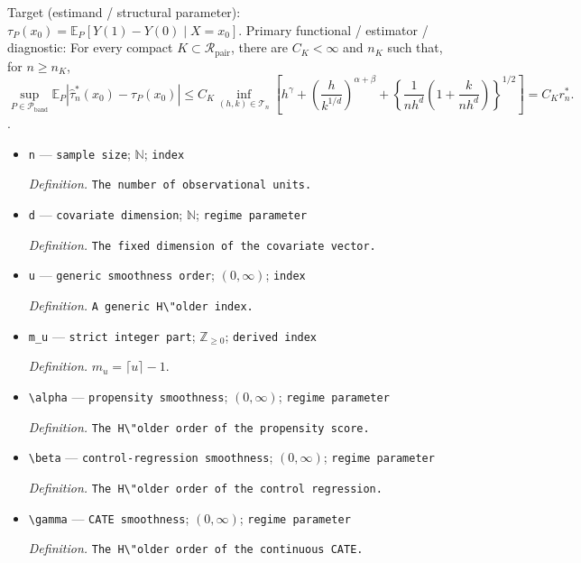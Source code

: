 \documentclass{article}
\begin{document}
Target (estimand / structural parameter): \(\tau_P(x_0)=\mathbb{E}_P[Y(1)-Y(0)\mid X=x_0]\).
Primary functional / estimator / diagnostic: For every compact \(K\subset\mathcal R_{\mathrm{pair}}\), there are \(C_K<\infty\) and \(n_K\) such that, for \(n\geq n_K\), \[\sup_{P\in\mathcal{P}_{\mathrm{band}}}\mathbb{E}_P|\widehat{\tau}^{*}_n(x_0)-\tau_P(x_0)|\leq C_K\inf_{(h,k)\in\mathcal T_n}\left[h^\gamma+\left(\frac{h}{k^{1/d}}\right)^{\alpha+\beta}+\left\{\frac{1}{nh^d}\left(1+\frac{k}{nh^d}\right)\right\}^{1/2}\right]=C_Kr_n^*.\].
\begin{itemize}
  \item \texttt{n} --- \texttt{sample size}; \(\mathbb{N}\); \texttt{index}
  \par\smallskip\noindent\emph{Definition.} \texttt{The number of observational units.}
  \item \texttt{d} --- \texttt{covariate dimension}; \(\mathbb{N}\); \texttt{regime parameter}
  \par\smallskip\noindent\emph{Definition.} \texttt{The fixed dimension of the covariate vector.}
  \item \texttt{u} --- \texttt{generic smoothness order}; \((0,\infty)\); \texttt{index}
  \par\smallskip\noindent\emph{Definition.} \texttt{A generic H\textbackslash{}\allowbreak{}"older index.}
  \item \texttt{m\_\allowbreak{}u} --- \texttt{strict integer part}; \(\mathbb{Z}_{\geq 0}\); \texttt{derived index}
  \par\smallskip\noindent\emph{Definition.} \(m_u=\lceil u\rceil-1\).
  \item \texttt{\textbackslash{}\allowbreak{}alpha} --- \texttt{propensity smoothness}; \((0,\infty)\); \texttt{regime parameter}
  \par\smallskip\noindent\emph{Definition.} \texttt{The H\textbackslash{}\allowbreak{}"older order of the propensity score.}
  \item \texttt{\textbackslash{}\allowbreak{}beta} --- \texttt{control-\allowbreak{}regression smoothness}; \((0,\infty)\); \texttt{regime parameter}
  \par\smallskip\noindent\emph{Definition.} \texttt{The H\textbackslash{}\allowbreak{}"older order of the control regression.}
  \item \texttt{\textbackslash{}\allowbreak{}gamma} --- \texttt{CATE smoothness}; \((0,\infty)\); \texttt{regime parameter}
  \par\smallskip\noindent\emph{Definition.} \texttt{The H\textbackslash{}\allowbreak{}"older order of the continuous CATE.}

\end{itemize}
\end{document}
